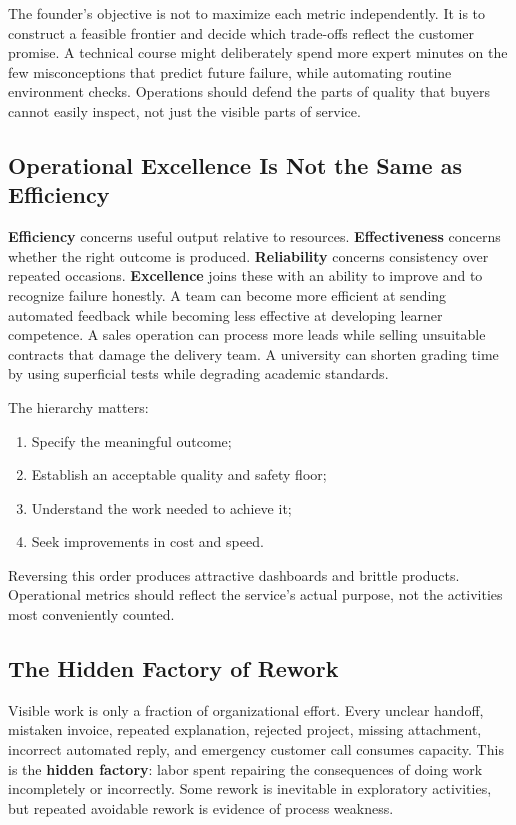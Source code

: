 The founder's objective is not to maximize each metric independently. It is to construct a feasible frontier and decide which trade-offs reflect the customer promise. A technical course might deliberately spend more expert minutes on the few misconceptions that predict future failure, while automating routine environment checks. Operations should defend the parts of quality that buyers cannot easily inspect, not just the visible parts of service.

\subsection{Operational Excellence Is Not the Same as Efficiency}
\label{sec:excellence_vs_efficiency}

\textbf{Efficiency} concerns useful output relative to resources. \textbf{Effectiveness} concerns whether the right outcome is produced. \textbf{Reliability} concerns consistency over repeated occasions. \textbf{Excellence} joins these with an ability to improve and to recognize failure honestly. A team can become more efficient at sending automated feedback while becoming less effective at developing learner competence. A sales operation can process more leads while selling unsuitable contracts that damage the delivery team. A university can shorten grading time by using superficial tests while degrading academic standards.

The hierarchy matters:
\begin{enumerate}
    \item Specify the meaningful outcome;
    \item Establish an acceptable quality and safety floor;
    \item Understand the work needed to achieve it;
    \item Seek improvements in cost and speed.
\end{enumerate}

Reversing this order produces attractive dashboards and brittle products. Operational metrics should reflect the service's actual purpose, not the activities most conveniently counted.

\subsection{The Hidden Factory of Rework}
\label{sec:hidden_factory}

Visible work is only a fraction of organizational effort. Every unclear handoff, mistaken invoice, repeated explanation, rejected project, missing attachment, incorrect automated reply, and emergency customer call consumes capacity. This is the \textbf{hidden factory}: labor spent repairing the consequences of doing work incompletely or incorrectly. Some rework is inevitable in exploratory activities, but repeated avoidable rework is evidence of process weakness.

